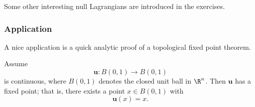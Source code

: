 Some other interesting null Lagrangians are introduced in the exercises.

\subsubsection{Application}

A nice application is a quick analytic proof of a topological fixed point theorem.

\begin{theorem}
\label{thm:brouwer-fixed-point-theorem}
Assume
\[
\mathbf{u} : B(0,1) \to B(0,1)
\]
is continuous, where $B(0,1)$ denotes the closed unit ball in $\R^n$. Then $\mathbf{u}$ has a fixed point; that is, there exists a point $x \in B(0,1)$ with
\[
\mathbf{u}(x) = x.
\]
\end{theorem}
